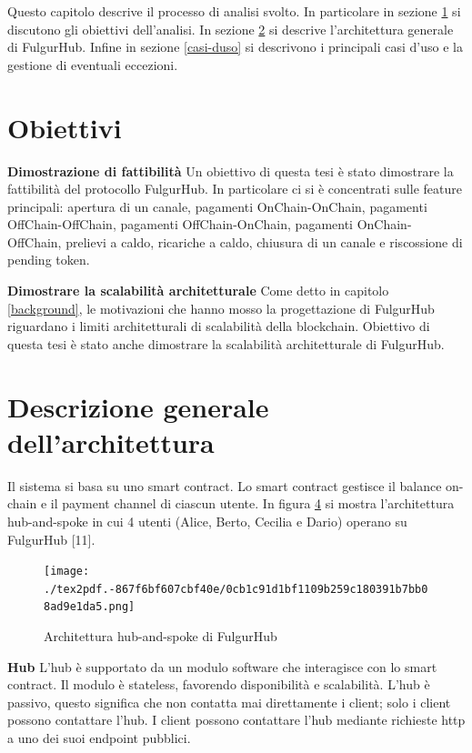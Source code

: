 \documentclass[12pt,italian,]{book}
\begin{document}
Questo capitolo descrive il processo di analisi svolto. In particolare in sezione \ref{obiettivi} si discutono gli obiettivi dell'analisi. In sezione \ref{descrizione-generale-dellarchitettura} si descrive l'architettura generale di FulgurHub. Infine in sezione \ref{casi-duso} si descrivono i principali casi d'uso e la gestione di eventuali eccezioni.

\hypertarget{obiettivi}{%
\section{Obiettivi}\label{obiettivi}}

\textbf{\textbf{Dimostrazione di fattibilità}} Un obiettivo di questa tesi è stato dimostrare la fattibilità del protocollo FulgurHub. In particolare ci si è concentrati sulle feature principali: apertura di un canale, pagamenti OnChain-OnChain, pagamenti OffChain-OffChain, pagamenti OffChain-OnChain, pagamenti OnChain-OffChain, prelievi a caldo, ricariche a caldo, chiusura di un canale e riscossione di pending token.

\textbf{\textbf{Dimostrare la scalabilità architetturale}} Come detto in capitolo \ref{background}, le motivazioni che hanno mosso la progettazione di FulgurHub riguardano i limiti architetturali di scalabilità della blockchain. Obiettivo di questa tesi è stato anche dimostrare la scalabilità architetturale di FulgurHub.

\hypertarget{descrizione-generale-dellarchitettura}{%
\section{Descrizione generale dell'architettura}\label{descrizione-generale-dellarchitettura}}

Il sistema si basa su uno smart contract. Lo smart contract gestisce il balance on-chain e il payment channel di ciascun utente. In figura \protect\hyperlink{architecture-hub-and-spoke}{4} si mostra l'architettura hub-and-spoke in cui 4 utenti (Alice, Berto, Cecilia e Dario) operano su FulgurHub {[}11{]}.

\begin{figure}
\centering
\texttt{[image: ./tex2pdf.-867f6bf607cbf40e/0cb1c91d1bf1109b259c180391b7bb08ad9e1da5.png]}
\caption{\protect\hypertarget{architecture-hub-and-spoke}{}{}Architettura hub-and-spoke di FulgurHub}
\end{figure}

\textbf{\textbf{Hub}} L'hub è supportato da un modulo software che interagisce con lo smart contract. Il modulo è stateless, favorendo disponibilità e scalabilità. L'hub è passivo, questo significa che non contatta mai direttamente i client; solo i client possono contattare l'hub. I client possono contattare l'hub mediante richieste http a uno dei suoi endpoint pubblici.
\end{document}
